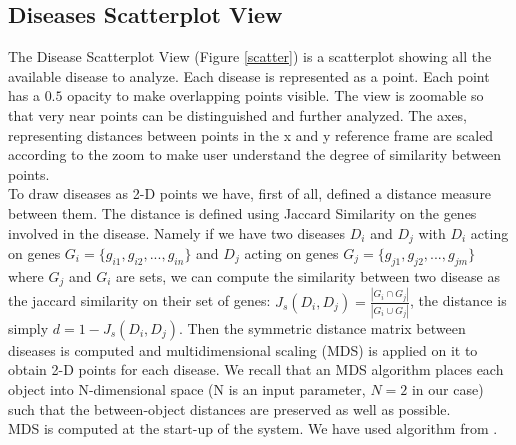 \documentclass[12pt,twocolumn,twoside]{article}
\begin{document}
\subsection*{Diseases Scatterplot View}
The Disease Scatterplot View (Figure \ref{scatter}) is a scatterplot showing all the available disease to analyze. Each disease is represented as a point. Each point has a $0.5$ opacity to make overlapping points visible. The view is zoomable so that very near points can be distinguished and further analyzed. The axes, representing distances between points in the x and y reference frame are scaled according to the zoom to make user understand the degree of similarity between points.\\ 
To draw diseases as 2-D points we have, first of all, defined a distance measure between them. The distance is defined using Jaccard Similarity on the genes involved in the disease. Namely if we have two diseases $D_i$ and $D_j$ with $D_i$ acting on genes $G_i=\{g_{i1},g_{i2},...,g_{in}\}$ and $D_j$ acting on genes $G_j=\{g_{j1},g_{j2},...,g_{jm}\}$ where $G_j$ and $G_i$ are sets, we can compute the similarity between two disease as the jaccard similarity on their set of genes: $J_s(D_i,D_j) = \frac{|G_i \cap G_j|}{|G_i \cup G_j|}$, the distance is simply $d =1-J_s(D_i,D_j)$.  Then the symmetric distance matrix between diseases is computed and multidimensional scaling (MDS) is applied on it to obtain 2-D points for each disease. We recall that an MDS algorithm places each object into N-dimensional space (N is an input parameter, $N=2$ in our case) such that the between-object distances are preserved as well as possible.\\ MDS is computed at the start-up of the system. We have used algorithm from \cite{mds_js}.
\end{document}
